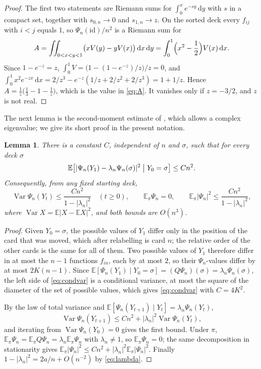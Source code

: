 \documentclass[11pt,a4paper]{article}
\numberwithin{equation}{section}
\newtheorem{lemma}[theorem]{Lemma}
\theoremstyle{remark}
\newcommand{\E}{\mathbb E}
\newcommand{\dd}{\,\mathrm d}
\newcommand{\abs}[1]{\lvert#1\rvert}
\DeclareMathOperator{\Var}{Var}
\begin{document}
\begin{proof}
The first two statements are Riemann sums for $\int_0^{x}e^{-sy}\dd y$ with $s$ in a compact set, together with $s_{0,n}\to0$ and $s_{1,n}\to z$. On the sorted deck every $f_{ij}$ with $i<j$ equals $1$, so $\Psi_n(\mathrm{id})/n^2$ is a Riemann sum for
\[
A=\iint_{0<x<y<1}\bigl(xV(y)-yV(x)\bigr)\dd x\dd y=\int_0^1\Bigl(x^2-\frac12\Bigr)V(x)\dd x .
\]
Since $1-e^{-z}=z$, $\int_0^1V=\bigl(1-(1-e^{-z})/z\bigr)/z=0$, and $\int_0^1x^2e^{-zx}\dd x=2/z^3-e^{-z}(1/z+2/z^2+2/z^3)=1+1/z$. Hence $A=\frac1z\bigl(\frac13-1-\frac1z\bigr)$, which is the value in \eqref{eq:A}. It vanishes only if $z=-3/2$, and $z$ is not real.
\end{proof}

The next lemma is the second-moment estimate of \cite[Lemma~2]{Wil03}, which allows a complex eigenvalue; we give its short proof in the present notation.

\begin{lemma}\label{lem:var}
There is a constant $C$, independent of $n$ and $\sigma$, such that for every deck $\sigma$
\begin{equation}\label{eq:condvar}
\E\bigl[\abs{\Psi_n(Y_1)-\lambda_n\Psi_n(\sigma)}^2\bigm|Y_0=\sigma\bigr]\le Cn^2 .
\end{equation}
Consequently, from any fixed starting deck,
\begin{equation}\label{eq:var}
\Var\Psi_n(Y_t)\le\frac{Cn^2}{1-\abs{\lambda_n}^2}\quad(t\ge0),\qquad \E_\pi\Psi_n=0,\qquad \E_\pi\abs{\Psi_n}^2\le\frac{Cn^2}{1-\abs{\lambda_n}^2},
\end{equation}
where $\Var X=\E\abs{X-\E X}^2$, and both bounds are $O(n^3)$.
\end{lemma}

\begin{proof}
Given $Y_0=\sigma$, the possible values of $Y_1$ differ only in the position of the card that was moved, which after relabelling is card $n$; the relative order of the other cards is the same for all of them. Two possible values of $Y_1$ therefore differ in at most the $n-1$ functions $f_{in}$, each by at most $2$, so their $\Psi_n$-values differ by at most $2K(n-1)$. Since $\E[\Psi_n(Y_1)\mid Y_0=\sigma]=(Q\Psi_n)(\sigma)=\lambda_n\Psi_n(\sigma)$, the left side of \eqref{eq:condvar} is a conditional variance, at most the square of the diameter of the set of possible values, which gives \eqref{eq:condvar} with $C=4K^2$.

By the law of total variance and $\E[\Psi_n(Y_{t+1})\mid Y_t]=\lambda_n\Psi_n(Y_t)$,
\[
\Var\Psi_n(Y_{t+1})\le Cn^2+\abs{\lambda_n}^2\Var\Psi_n(Y_t),
\]
and iterating from $\Var\Psi_n(Y_0)=0$ gives the first bound. Under $\pi$, $\E_\pi\Psi_n=\E_\pi Q\Psi_n=\lambda_n\E_\pi\Psi_n$ with $\lambda_n\ne1$, so $\E_\pi\Psi_n=0$; the same decomposition in stationarity gives $\E_\pi\abs{\Psi_n}^2\le Cn^2+\abs{\lambda_n}^2\E_\pi\abs{\Psi_n}^2$. Finally $1-\abs{\lambda_n}^2=2a/n+O(n^{-2})$ by \eqref{eq:lambda}.
\end{proof}
\end{document}
